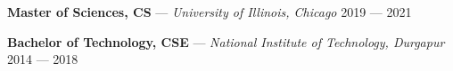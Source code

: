 \textbf{Master of Sciences, CS} --- \textit{University of Illinois, Chicago} \hfill 2019 --- 2021

\textbf{Bachelor of Technology, CSE} --- \textit{National Institute of Technology, Durgapur} \hfill 2014 --- 2018